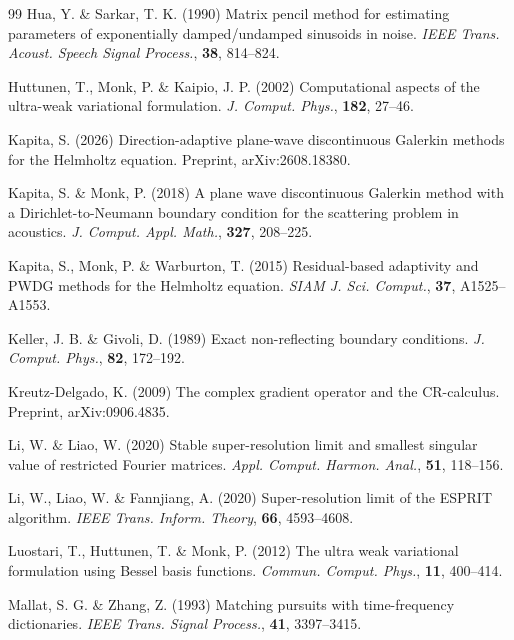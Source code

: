 \documentclass[11pt]{article}
\numberwithin{equation}{section}
\begin{document}
\begin{thebibliography}{99}
Hua, Y. \& Sarkar, T. K. (1990) Matrix pencil method for estimating parameters of exponentially damped/undamped sinusoids in noise. \emph{IEEE Trans. Acoust. Speech Signal Process.}, \textbf{38}, 814--824.

Huttunen, T., Monk, P. \& Kaipio, J. P. (2002) Computational aspects of the ultra-weak variational formulation. \emph{J. Comput. Phys.}, \textbf{182}, 27--46.

Kapita, S. (2026) Direction-adaptive plane-wave discontinuous Galerkin methods for the Helmholtz equation. Preprint, arXiv:2608.18380.

Kapita, S. \& Monk, P. (2018) A plane wave discontinuous Galerkin method with a Dirichlet-to-Neumann boundary condition for the scattering problem in acoustics. \emph{J. Comput. Appl. Math.}, \textbf{327}, 208--225.

Kapita, S., Monk, P. \& Warburton, T. (2015) Residual-based adaptivity and PWDG methods for the Helmholtz equation. \emph{SIAM J. Sci. Comput.}, \textbf{37}, A1525--A1553.

Keller, J. B. \& Givoli, D. (1989) Exact non-reflecting boundary conditions. \emph{J. Comput. Phys.}, \textbf{82}, 172--192.

Kreutz-Delgado, K. (2009) The complex gradient operator and the CR-calculus. Preprint, arXiv:0906.4835.

Li, W. \& Liao, W. (2020) Stable super-resolution limit and smallest singular value of restricted Fourier matrices. \emph{Appl. Comput. Harmon. Anal.}, \textbf{51}, 118--156.

Li, W., Liao, W. \& Fannjiang, A. (2020) Super-resolution limit of the ESPRIT algorithm. \emph{IEEE Trans. Inform. Theory}, \textbf{66}, 4593--4608.

Luostari, T., Huttunen, T. \& Monk, P. (2012) The ultra weak variational formulation using Bessel basis functions. \emph{Commun. Comput. Phys.}, \textbf{11}, 400--414.

Mallat, S. G. \& Zhang, Z. (1993) Matching pursuits with time-frequency dictionaries. \emph{IEEE Trans. Signal Process.}, \textbf{41}, 3397--3415.


\end{thebibliography}
\end{document}
